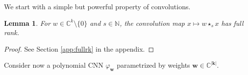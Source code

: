 \documentclass[twoside]{article}
\theoremstyle{plain}%
\newtheorem{exmp}[thm]{Example}
\newtheorem{lem}[thm]{Lemma}
\theoremstyle{definition}
\theoremstyle{remark}
\newcommand{\conv}[1]{\star_{#1}}
\begin{document}
We start with a simple but powerful property of convolutions.
\begin{lem}\label{lem:fullrk}
    For $w \in \mathbb{C}^k \setminus \{ 0 \}$ and $s \in \mathbb{N}$, the convolution map $x \mapsto w \conv{s} x$ has full rank. 
\end{lem}
\begin{proof}
See Section \ref{app:fullrk} in the appendix.  
\end{proof}
Consider now a polynomial CNN  $\varphi_\mathbf{w}$ parametrized by weights $\mathbf{w} \in \mathbb{C}^{|\mathbf{k}|}$. 

\end{document}
